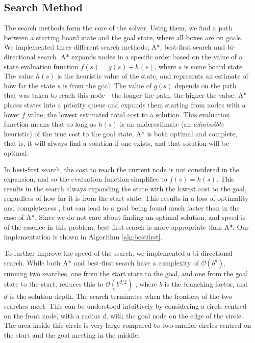 \documentclass[a4paper,11pt]{article}
\begin{document}
\subsection{Search Method}
The search methods form the core of the solver. Using them, we find a path
between a starting board state and the goal state, where all boxes are on
goals. We implemented three different search methods; A*, best-first search and
bi-directional search. A* expands nodes in a specific order based on the value
of a state evaluation function $f(s)=g(s)+h(s)$, where $s$ is some board
state. The value $h(s)$ is the heuristic value of the state, and represents an
estimate of how far the state $s$ is from the goal. The value of $g(s)$ depends
on the path that was taken to reach this node---the longer the path, the higher
the value. A* places states into a priority queue and expands them starting from
nodes with a lower $f$ value; the lowest estimated total cost to a
solution. This evaluation function means that so long as $h(s)$ is an
underestimate (an \emph{admissible} heuristic) of the true cost to the goal
state, A* is both optimal and complete, that is, it will always find a solution
if one exists, and that solution will be optimal\cite{aima}.

In best-first search, the cost to reach the current node is not considered in
the expansion, and so the evaluation function simplifies to $f(s)=h(s)$. This
results in the search always expanding the state with the lowest cost to the
goal, regardless of how far it is from the start state. This results in a loss
of optimality and completeness \cite{aima}, but can lead to a goal being found
much faster than in the case of A*. Since we do not care about finding an
optimal solution, and speed is of the essence in this problem, best-first search
is more appropriate than A*. Our implementation is shown in Algorithm
\ref{alg:bestfirst}.

To further improve the speed of the search, we implemented a
bi-directional search. While both A* and best-first search have a
complexity of $\mathcal{O}(b^d)$, running two searches, one from the
start state to the goal, and one from the goal state to the start,
reduces this to $\mathcal{O}(b^{d/2})$ \cite{aima}, where $b$ is the
branching factor, and $d$ is the solution depth. The search terminates
when the frontiers of the two searches meet. This can be understood
intuitively by considering a circle centred on the front node, with a
radius $d$, with the goal node on the edge of the circle. The area
inside this circle is very large compared to two smaller circles
centred on the start and the goal meeting in the middle. 
\end{document}
